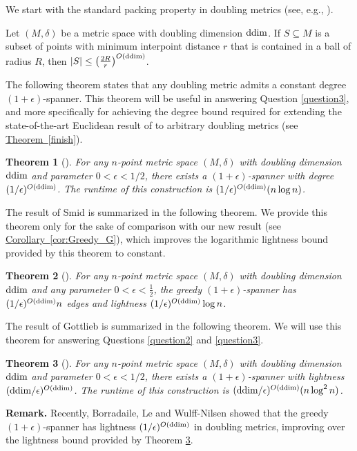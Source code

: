 \documentclass[11pt,letterpaper]{article}
\newtheorem{theorem}{Theorem}
\newcommand{\ddim}{{\rm ddim}}
\newcommand{\eps}{\epsilon}
\newcommand{\namedref}[2]{\hyperref[#2]{#1~\ref*{#2}}}
\newcommand{\theoremref}[1]{\namedref{Theorem}{#1}}
\newcommand{\corollaryref}[1]{\namedref{Corollary}{#1}}
\begin{document}
We start with the
standard packing property in doubling metrics (see, e.g.,  \cite{GKL03}).
\begin{lemma} \label{lem:doubling_packing}
	Let $(M,\delta)$ be a metric space  with doubling dimension $\ddim$.
	If $S \subseteq M$ is a subset of points with minimum interpoint distance $r$
	that is contained in a ball of radius $R$, then
	$|S| \le \left(\frac{2R}{r}\right)^{O(\ddim)}$.
\end{lemma}



The following theorem states that any doubling metric admits a constant degree $(1+\eps)$-spanner. This theorem will be useful in answering Question \ref{question3}, and more specifically for achieving the degree bound required for extending the state-of-the-art Euclidean result of \cite{GLN02} to arbitrary doubling metrics (see \theoremref{finish}).


\begin{theorem}[\cite{CGMZ16,GR08}]\label{thm:doubling_degree}
	For any $n$-point metric  space $(M,\delta)$ with doubling dimension
	$\ddim$ and parameter $0<\epsilon<1/2$, there exists a $(1 + \epsilon)$-spanner with degree $(1/\epsilon)^{O(\ddim)}$.
	The runtime of this construction is $(1/\eps)^{O(\ddim)}(n \log n)$.
\end{theorem}


The result of Smid \cite{Smid09} is summarized in the following theorem. We provide this theorem only for the sake of comparison with our new result (see \corollaryref{cor:Greedy_G}),
which improves the logarithmic lightness bound provided by this theorem to constant.
\begin{theorem}[\cite{Smid09}]\label{thm:smid09}
	For any $n$-point metric space $(M,\delta)$ with doubling dimension $\ddim$ and any parameter $0<\epsilon<\frac{1}{2}$,  the greedy $(1+\epsilon)$-spanner has
	$(1/\epsilon)^{O(\ddim)}n$  edges and lightness $(1/\epsilon)^{O(\ddim)}\log n$.
\end{theorem}

The result of Gottlieb \cite{Got15} is summarized in the following theorem. We will use this theorem for answering Questions \ref{question2} and \ref{question3}.
\begin{theorem}[\cite{Got15}]\label{thm:Got15}
	For any $n$-point metric space $(M,\delta)$ with doubling dimension $\ddim$ and parameter $0<\epsilon<1/2$,
	there exists a $(1+\epsilon)$-spanner  with lightness $(\ddim/\epsilon)^{O(\ddim)}$.
	The runtime of this construction is $(\ddim/\epsilon)^{O(\ddim)} (n\log^{2}n)$.
\end{theorem}
{\bf Remark.} Recently, Borradaile, Le and Wulff{-}Nilsen \cite{BLW19} showed that the greedy $(1+\eps)$-spanner has lightness  $(1/\epsilon)^{O(\ddim)}$ 
in doubling metrics, improving over the lightness bound provided by Theorem \ref{thm:Got15}. 
\end{document}
